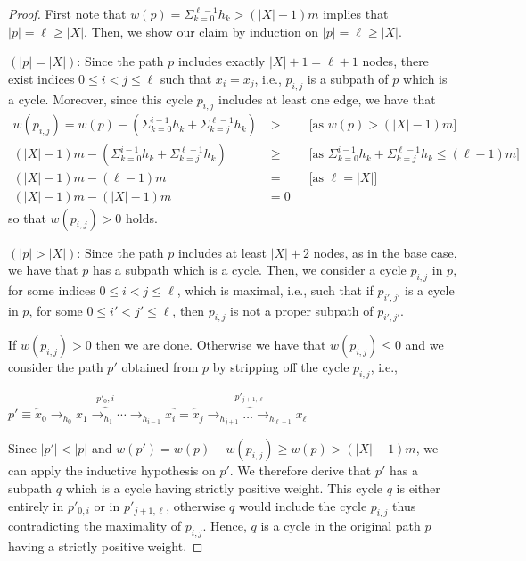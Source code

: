 \begin{proof}
  First note that \(w(p) = \Sigma_{k=0}^{\ell-1} h_k > (|X|-1)m\) implies that \(|p|=\ell \geq |X|\). 
  Then, we show our claim by induction on \(|p|=\ell \geq |X|\).


  \noindent
  \((|p|=|X|)\): Since the path \(p\) includes exactly \(|X|+1=\ell+1\) nodes, there exist
  indices \(0\leq i < j\leq \ell\) such that \(x_i=x_j\), i.e., \(p_{i,j}\) is a subpath of \(p\) which is a
  cycle. Moreover, since this cycle \(p_{i,j}\) includes at least one edge, we have that
  \begin{align*}
    w(p_{i,j}) = w(p) - (\Sigma_{k=0}^{i-1} h_k + \Sigma_{k=j}^{\ell-1}
    h_k) &> \qquad \text{[as \(w(p) > (|X|-1)m\)]}\\
    (|X|-1)m - (\Sigma_{k=0}^{i-1} h_k + \Sigma_{k=j}^{\ell-1}
    h_k) &\geq \qquad \text{[as \(\Sigma_{k=0}^{i-1} h_k + \Sigma_{k=j}^{\ell-1}
        h_k \leq (\ell-1)m\)]}\\
    (|X|-1)m - (\ell-1)m &= \qquad \text{[as \(\ell=|X|\)]}  \\  
    (|X|-1)m - (|X|-1)m &= 0
  \end{align*}
  so that \(w(p_{i,j})>0\) holds. 

  \medskip
  \noindent

  \noindent
  \((|p|>|X|)\): Since the path \(p\) includes at least \(|X|+2\) nodes, as in
  the base case, we have that \(p\) has a subpath which is a cycle. Then, we consider a
  cycle \(p_{i,j}\) in \(p\), for some indices \(0\leq i < j\leq \ell\), which is maximal, i.e.,  such that
  if  \(p_{i',j'}\) is a cycle in \(p\),  for some 
  \(0\leq i' < j'\leq \ell\), then \(p_{i,j}\) is not a proper subpath of \(p_{i',j'}\).

  \noindent
  If \(w(p_{i,j})>0\) then we are done. Otherwise we have that  \(w(p_{i,j})\leq 0\) 
  and we consider the path \(p'\) obtained from \(p\) by stripping off the cycle \(p_{i,j}\), i.e.,
  \begin{center}
    \(p' \equiv \overbrace{x_0 \to_{h_0} x_1 \to_{h_1} \cdots \to_{h_{i-1}} x_i}^{p'_0,i} =
    \overbrace{
      x_j\to_{h_{j+1}} \ldots \to_{h_{\ell-1}} x_{\ell}}^{p'_{j+1,\ell}}\)
  \end{center}
  Since \(|p'| < |p|\) and
  \(w(p')=w(p)-w(p_{i,j})\geq w(p)> (|X|-1)m\), we can apply the
  inductive hypothesis on \(p'\).  We therefore derive that \(p'\) has
  a subpath \(q\) which is a cycle having strictly positive
  weight. This cycle \(q\) is either entirely in \(p'_{0,i}\) or in
  \(p'_{j+1,\ell}\), otherwise \(q\) would include the cycle
  \(p_{i,j}\) thus contradicting the maximality of \(p_{i,j}\). Hence,
  \(q\) is a cycle in the original path \(p\) having a strictly
  positive weight.
\end{proof}

